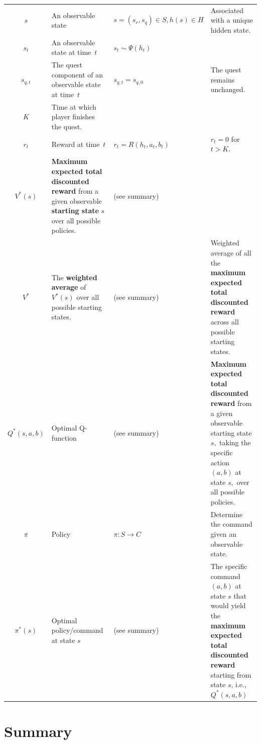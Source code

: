 \documentclass[11pt,a4paper]{article}
\begin{document}
\begin{small}
\begin{xltabular}{\textwidth}{@{} c >{\hsize\raggedright\arraybackslash}X >{\hsize\raggedright\arraybackslash}X >{\hsize\raggedright\arraybackslash}X @{}}
$s$ & An observable state & $s = (s_r, s_q) \in S, h(s) \in H$ & Associated with a unique hidden state. \\
$s_t$ & An observable state at time~$t$ & $s_t \sim \Psi(h_t)$ & \\
$s_{q,t}$ & The quest component of an observable state at time~$t$ & $s_{q,t} = s_{q,0}$ & The quest remains unchanged. \\
$K$ & Time at which player finishes the quest. & & \\
$r_t$ & Reward at time~$t$ & $r_t = R(h_t, a_t, b_t)$ & $r_t = 0$ for $t > K.$ \\
$V^*(s)$ & \textbf{Maximum expected total discounted reward} from a given observable \textbf{starting state} $s$ over all possible policies. & (see summary) & \\
$V^*$ & The \textbf{weighted average} of $V^*(s)$ over all possible starting states. & (see summary) & Weighted average of all the \textbf{maximum expected total discounted reward} across all possible starting states. \\
$Q^*(s,a,b)$ & Optimal Q-function & (see summary) & \textbf{Maximum expected total discounted reward} from a given observable starting state $s,$ taking the specific action $(a,b)$ at state $s,$ over all possible policies. \\
$\pi$ & Policy & $\pi: S \to C$ & Determine the command given an observable state. \\
$\pi^*(s)$ & Optimal policy/command at state $s$ & (see summary) & The specific command $(a,b)$ at state $s$ that would yield the \textbf{maximum expected total discounted reward} starting from state $s$, i.e., $Q^*(s,a,b)$ \\
\end{xltabular}
\end{small}

\section*{Summary}
\end{document}
